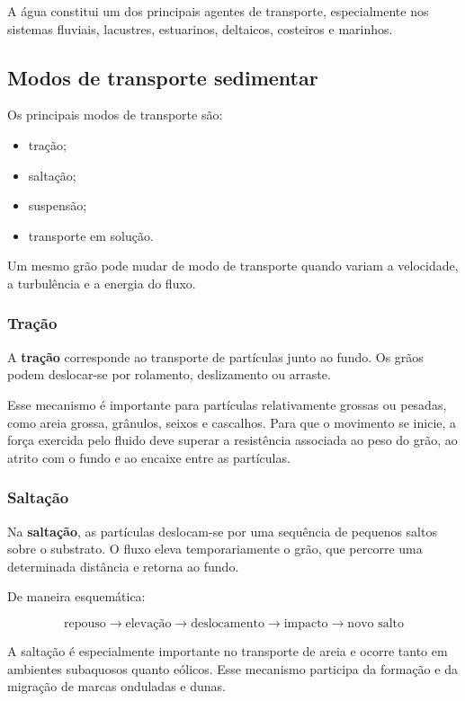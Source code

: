 A água constitui um dos principais agentes de transporte, especialmente nos
sistemas fluviais, lacustres, estuarinos, deltaicos, costeiros e marinhos.

\subsection{Modos de transporte sedimentar}

Os principais modos de transporte são:

\begin{itemize}
    \item tração;
    \item saltação;
    \item suspensão;
    \item transporte em solução.
\end{itemize}

Um mesmo grão pode mudar de modo de transporte quando variam a velocidade, a
turbulência e a energia do fluxo.

\subsubsection{Tração}

A \textbf{tração} corresponde ao transporte de partículas junto ao fundo. Os
grãos podem deslocar-se por rolamento, deslizamento ou arraste.

Esse mecanismo é importante para partículas relativamente grossas ou pesadas,
como areia grossa, grânulos, seixos e cascalhos. Para que o movimento se inicie,
a força exercida pelo fluido deve superar a resistência associada ao peso do
grão, ao atrito com o fundo e ao encaixe entre as partículas.

\subsubsection{Saltação}

Na \textbf{saltação}, as partículas deslocam-se por uma sequência de pequenos
saltos sobre o substrato. O fluxo eleva temporariamente o grão, que percorre uma
determinada distância e retorna ao fundo.

De maneira esquemática:

\[
\text{repouso}
\rightarrow
\text{elevação}
\rightarrow
\text{deslocamento}
\rightarrow
\text{impacto}
\rightarrow
\text{novo salto}
\]

A saltação é especialmente importante no transporte de areia e ocorre tanto em
ambientes subaquosos quanto eólicos. Esse mecanismo participa da formação e da
migração de marcas onduladas e dunas.

